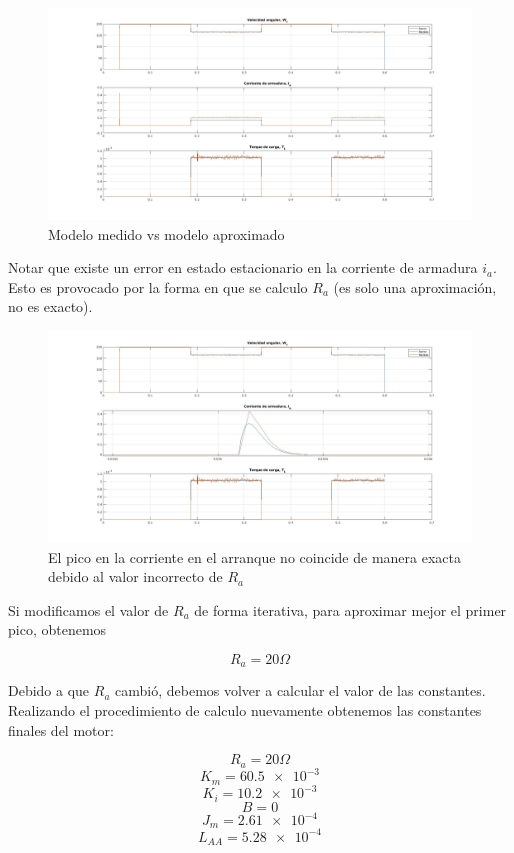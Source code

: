 \documentclass{article}
\begin{document}
\begin{figure}[!h]
  \centering
  \includegraphics[width=1\textwidth]{img/mot5-3.jpg}
  \caption{Modelo medido vs modelo aproximado}
\end{figure}

Notar que existe un error en estado estacionario en la corriente de armadura $i_a$. Esto es
provocado por la forma en que se calculo $R_a$ (es solo una aproximación, no es exacto). 

\begin{figure}[!h]
  \centering
  \includegraphics[width=1\textwidth]{img/mot5-4.jpg}
  \caption{El pico en la corriente en el arranque no coincide de manera exacta debido al valor incorrecto de $R_a$}
\end{figure}

Si modificamos el valor de $R_a$ de forma iterativa, para aproximar mejor el primer pico, obtenemos

$$R_a = 20\Omega$$

Debido a que $R_a$ cambió, debemos volver a calcular el valor de las constantes. Realizando el procedimiento de calculo
nuevamente obtenemos las constantes finales del motor:

$$R_a = 20\Omega$$
$$K_m = \num{60.5e-3}$$
$$K_i = \num{10.2e-3}$$
$$B = \num{0}$$
$$J_m = \num{2.61e-4}$$
$$L_{AA} = \num{5.28e-4}$$
\end{document}
